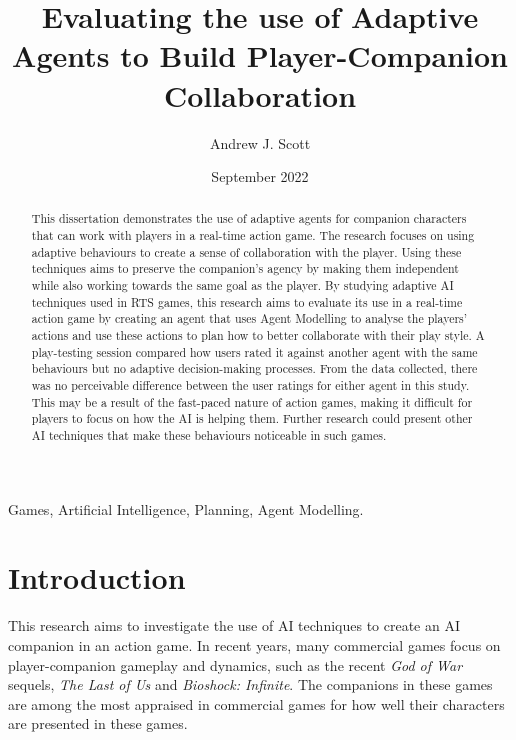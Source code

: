 \documentclass{IEEEtran}
\title{Evaluating the use of Adaptive Agents to Build Player-Companion Collaboration}
\author{Andrew J. Scott}
\date{September 2022}
\begin{document}
	\maketitle

\begin{abstract}
This dissertation demonstrates the use of adaptive agents for companion characters that can work with players in a real-time action game. The research focuses on using adaptive behaviours to create a sense of collaboration with the player. Using these techniques aims to preserve the companion’s agency by making them independent while also working towards the same goal as the player. By studying adaptive AI techniques used in RTS games, this research aims to evaluate its use in a real-time action game by creating an agent that uses Agent Modelling to analyse the players’ actions and use these actions to plan how to better collaborate with their play style. A play-testing session compared how users rated it against another agent with the same behaviours but no adaptive decision-making processes. From the data collected, there was no perceivable difference between the user ratings for either agent in this study. This may be a result of the fast-paced nature of action games, making it difficult for players to focus on how the AI is helping them. Further research could present other AI techniques that make these behaviours noticeable in such games.
\end{abstract}

 \begin{IEEEkeywords}
Games, Artificial Intelligence, Planning, Agent Modelling.
\end{IEEEkeywords}

\section{Introduction}
\label{Intro}


This research aims to investigate the use of AI techniques to create an AI companion in an action game. In recent years, many commercial games focus on player-companion gameplay and dynamics, such as the recent \textit{God of War} sequels, \textit{The Last of Us} and \textit{Bioshock: Infinite}. The companions in these games are among the most appraised in commercial games for how well their characters are presented in these games.

\end{document}
